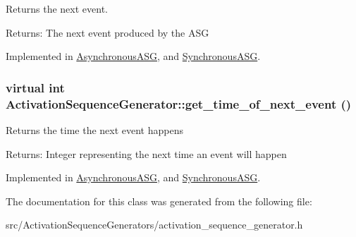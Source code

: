 Returns the next event. \begin{Desc}
\item[Returns:]The next event produced by the ASG \end{Desc}


Implemented in \hyperlink{class_asynchronous_a_s_g_cbec6379ed8ba4ea1351e2b1d76b9671}{AsynchronousASG}, and \hyperlink{class_synchronous_a_s_g_05fbdbd3ed9638ab90c3817944fbba95}{SynchronousASG}.\hypertarget{class_activation_sequence_generator_724cfa2e135813db7becb90af1783050}{
\subsubsection[get\_\-time\_\-of\_\-next\_\-event]{\setlength{\rightskip}{0pt plus 5cm}virtual int ActivationSequenceGenerator::get\_\-time\_\-of\_\-next\_\-event ()}}
\label{class_activation_sequence_generator_724cfa2e135813db7becb90af1783050}


Returns the time the next event happens \begin{Desc}
\item[Returns:]Integer representing the next time an event will happen \end{Desc}


Implemented in \hyperlink{class_asynchronous_a_s_g_163256359314a7c69e5cfb684f311201}{AsynchronousASG}, and \hyperlink{class_synchronous_a_s_g_b675d2066e00287119c772b0411531b5}{SynchronousASG}.

The documentation for this class was generated from the following file:\begin{CompactItemize}
\item 
src/ActivationSequenceGenerators/activation\_\-sequence\_\-generator.h\end{CompactItemize}
